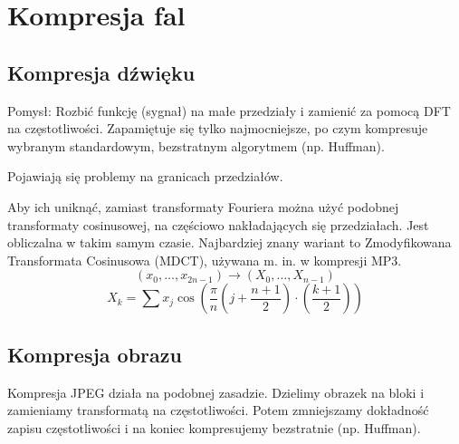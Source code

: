 \section{Kompresja fal}
\subsection{Kompresja dźwięku}
Pomysł: Rozbić funkcję (sygnał) na małe przedziały i zamienić za pomocą DFT na częstotliwości. Zapamiętuje się tylko najmocniejsze, po czym kompresuje wybranym standardowym, bezstratnym algorytmem (np. Huffman).
\begin{warning}
    Pojawiają się problemy na granicach przedziałów.
\end{warning}
Aby ich uniknąć, zamiast transformaty Fouriera można użyć podobnej transformaty cosinusowej, na częściowo nakładających się przedziałach. Jest obliczalna w takim samym czasie. Najbardziej znany wariant to Zmodyfikowana Transformata Cosinusowa (MDCT), używana m. in. w kompresji MP3.
\[
    (x_0, \dots, x_{2n-1}) \rightarrow (X_0, \dots, X_{n-1})
\]
\[
    X_k = \sum x_j \cos\left(\frac{\pi}{n}\left(j + \frac{n + 1}{2}\right)\cdot\left(\frac{k+1}{2}\right)\right)
\]
\subsection{Kompresja obrazu}
Kompresja JPEG działa na podobnej zasadzie. Dzielimy obrazek na bloki i zamieniamy transformatą na częstotliwości. Potem zmniejszamy dokładność zapisu częstotliwości i na koniec kompresujemy bezstratnie (np. Huffman).